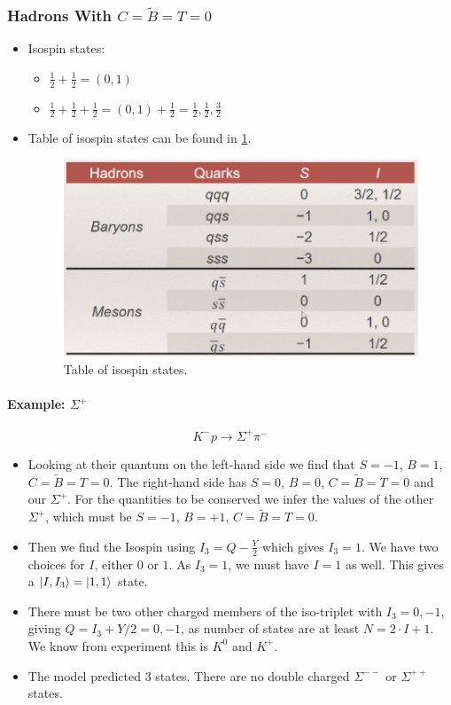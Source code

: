 \subsubsection{Hadrons With $C = \tilde{B} = T = 0$}
\begin{itemize}
    \item Isospin states: 
    \begin{itemize}
        \item $\frac{1}{2} + \frac{1}{2} = (0,1)$
        \item $\frac{1}{2} + \frac{1}{2} + \frac{1}{2} = (0,1) + \frac{1}{2} = \frac{1}{2}, \frac{1}{2}, \frac{3}{2}$
    \end{itemize}
    \item Table of isospin states can be found in \cref{fig: isospin_states}.
    \begin{figure}[h!]
    \centering
    \includegraphics[width = .5\textwidth]{isospin_states.png}
    \caption{Table of isospin states.}
    \label{fig: isospin_states}
    \end{figure}
    
\end{itemize}

\paragraph{Example: $Σ^{+}$}
\begin{equation}
  K^{-} p → Σ^{+} π^{-}
\end{equation}
\begin{itemize}
    \item Looking at their quantum on the left-hand side we find that $S = -1$, $B = 1$, $C = \tilde{B} = T = 0$. The right-hand side has $S = 0$, $B = 0$, $C = \tilde{B} = T = 0$ and our $Σ^{+}$. For the quantities to be conserved we infer the values of the other $Σ^{+}$, which must be $S = -1$, $B = +1$, $C = \tilde{B} = T = 0$.
    \item Then we find the Isospin using $I_3 = Q - \frac{Y}{2}$ which gives $I_3 = 1$. We have two choices for $I$, either $0$ or $1$. As $I_3 = 1$, we must have $I = 1$ as well. This gives a $\ket{I, I_3} = \ket{1,1}$ state. 
    \item There must be two other charged members of the iso-triplet with $I_3 = 0, -1$, giving $Q = I_3 + Y / 2 = 0,-1$, as number of states are at least $N = 2 ⋅ I + 1$. We know from experiment this is $K^{0}$ and $K^{+}$. 
    \item The model predicted 3 states. There are no double charged $Σ^{--}$ or $Σ^{++}$ states. 
\end{itemize}

